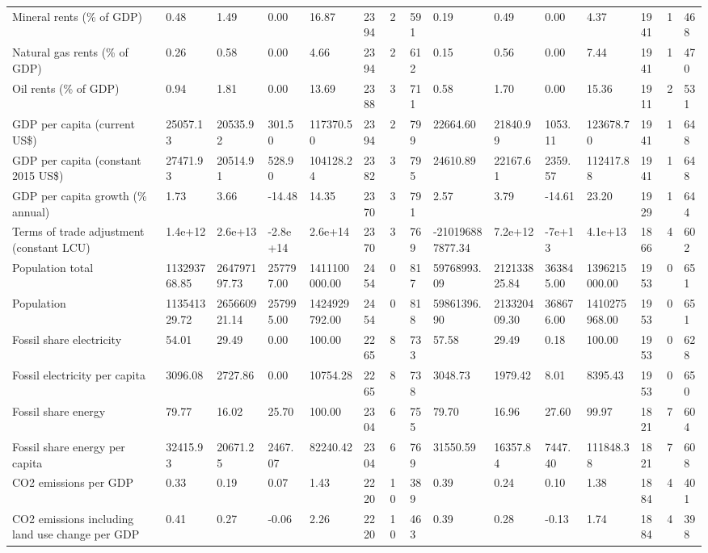 \begin{longtable}{lllllllllllllll}
\addlinespace
Mineral rents (\% of GDP) & 0.48 & 1.49 & 0.00 & 16.87 & 2394 & 2 & 591 & 0.19 & 0.49 & 0.00 & 4.37 & 1941 & 1 & 468\\
Natural gas rents (\% of GDP) & 0.26 & 0.58 & 0.00 & 4.66 & 2394 & 2 & 612 & 0.15 & 0.56 & 0.00 & 7.44 & 1941 & 1 & 470\\
Oil rents (\% of GDP) & 0.94 & 1.81 & 0.00 & 13.69 & 2388 & 3 & 711 & 0.58 & 1.70 & 0.00 & 15.36 & 1911 & 2 & 531\\
GDP per capita (current US\$) & 25057.13 & 20535.92 & 301.50 & 117370.50 & 2394 & 2 & 799 & 22664.60 & 21840.99 & 1053.11 & 123678.70 & 1941 & 1 & 648\\
GDP per capita (constant 2015 US\$) & 27471.93 & 20514.91 & 528.90 & 104128.24 & 2382 & 3 & 795 & 24610.89 & 22167.61 & 2359.57 & 112417.88 & 1941 & 1 & 648\\
\addlinespace
GDP per capita growth (\% annual) & 1.73 & 3.66 & -14.48 & 14.35 & 2370 & 3 & 791 & 2.57 & 3.79 & -14.61 & 23.20 & 1929 & 1 & 644\\
Terms of trade adjustment (constant LCU) & 1.4e+12 & 2.6e+13 & -2.8e+14 & 2.6e+14 & 2370 & 3 & 769 & -210196887877.34 & 7.2e+12 & -7e+13 & 4.1e+13 & 1866 & 4 & 602\\
Population total & 113293768.85 & 264797197.73 & 257797.00 & 1411100000.00 & 2454 & 0 & 817 & 59768993.09 & 212133825.84 & 363845.00 & 1396215000.00 & 1953 & 0 & 651\\
Population & 113541329.72 & 265660921.14 & 257995.00 & 1424929792.00 & 2454 & 0 & 818 & 59861396.90 & 213320409.30 & 368676.00 & 1410275968.00 & 1953 & 0 & 651\\
Fossil share electricity & 54.01 & 29.49 & 0.00 & 100.00 & 2265 & 8 & 733 & 57.58 & 29.49 & 0.18 & 100.00 & 1953 & 0 & 628\\
\addlinespace
Fossil electricity per capita & 3096.08 & 2727.86 & 0.00 & 10754.28 & 2265 & 8 & 738 & 3048.73 & 1979.42 & 8.01 & 8395.43 & 1953 & 0 & 650\\
Fossil share energy & 79.77 & 16.02 & 25.70 & 100.00 & 2304 & 6 & 755 & 79.70 & 16.96 & 27.60 & 99.97 & 1821 & 7 & 604\\
Fossil share energy per capita & 32415.93 & 20671.25 & 2467.07 & 82240.42 & 2304 & 6 & 769 & 31550.59 & 16357.84 & 7447.40 & 111848.38 & 1821 & 7 & 608\\
CO2 emissions per GDP & 0.33 & 0.19 & 0.07 & 1.43 & 2220 & 10 & 389 & 0.39 & 0.24 & 0.10 & 1.38 & 1884 & 4 & 401\\
CO2 emissions including land use change per GDP & 0.41 & 0.27 & -0.06 & 2.26 & 2220 & 10 & 463 & 0.39 & 0.28 & -0.13 & 1.74 & 1884 & 4 & 398\\

\end{longtable}
